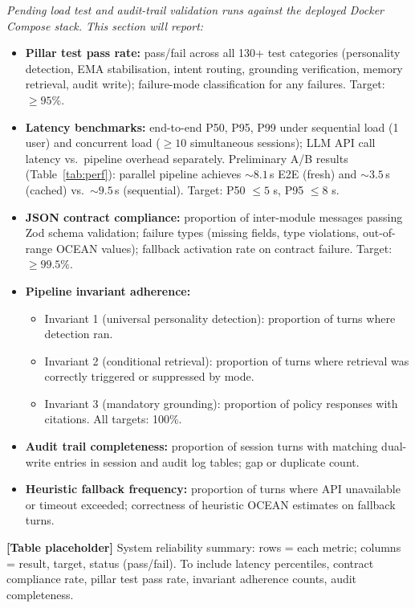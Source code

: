 \documentclass[10pt,a4paper]{report}
\begin{document}
\begin{tcolorbox}[colback=yellow!8!white, colframe=orange!70!black, title=\textbf{Placeholder --- System Reliability (RQ5)}, fonttitle=\bfseries, left=4pt, right=4pt, top=4pt, bottom=4pt]
\textit{Pending load test and audit-trail validation runs against the deployed Docker Compose stack. This section will report:}

\begin{itemize}[leftmargin=*, nosep]
  \item \textbf{Pillar test pass rate:} pass/fail across all 130+ test categories (personality detection, EMA stabilisation, intent routing, grounding verification, memory retrieval, audit write); failure-mode classification for any failures. Target: $\geq 95\%$.
  \item \textbf{Latency benchmarks:} end-to-end P50, P95, P99 under sequential load (1 user) and concurrent load ($\geq 10$ simultaneous sessions); LLM API call latency vs.\ pipeline overhead separately. Preliminary A/B results (Table~\ref{tab:perf}): parallel pipeline achieves ${\sim}8.1$\,s E2E (fresh) and ${\sim}3.5$\,s (cached) vs.\ ${\sim}9.5$\,s (sequential). Target: P50 $\leq 5$ s, P95 $\leq 8$ s.
  \item \textbf{JSON contract compliance:} proportion of inter-module messages passing Zod schema validation; failure types (missing fields, type violations, out-of-range OCEAN values); fallback activation rate on contract failure. Target: $\geq 99.5\%$.
  \item \textbf{Pipeline invariant adherence:}
    \begin{itemize}[nosep]
      \item Invariant 1 (universal personality detection): proportion of turns where detection ran.
      \item Invariant 2 (conditional retrieval): proportion of turns where retrieval was correctly triggered or suppressed by mode.
      \item Invariant 3 (mandatory grounding): proportion of policy responses with citations. All targets: 100\%.
    \end{itemize}
  \item \textbf{Audit trail completeness:} proportion of session turns with matching dual-write entries in session and audit log tables; gap or duplicate count.
  \item \textbf{Heuristic fallback frequency:} proportion of turns where API unavailable or timeout exceeded; correctness of heuristic OCEAN estimates on fallback turns.
\end{itemize}

\medskip
\textbf{[Table placeholder]} System reliability summary: rows = each metric; columns = result, target, status (pass/fail). To include latency percentiles, contract compliance rate, pillar test pass rate, invariant adherence counts, audit completeness.
\end{tcolorbox}
\end{document}
